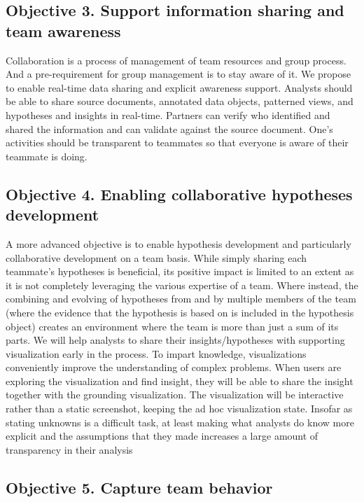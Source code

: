 \subsection{Objective 3. Support information sharing and team awareness}

Collaboration is a process of management of team resources and group process. And a pre-requirement for group management is to stay aware of it. We propose to enable real-time data sharing and explicit awareness support.
Analysts should be able to share source documents, annotated data objects, patterned
views, and hypotheses and insights in real-time. Partners can verify who
identified and shared the information and can validate against the source
document. One’s activities should be transparent to teammates so that everyone is aware of their teammate is doing.

\subsection{Objective 4. Enabling collaborative hypotheses development}

A more advanced objective is to enable hypothesis development and particularly collaborative development on a team basis. While simply
sharing each teammate's hypotheses is beneficial, its positive impact is
limited to an extent as it is not completely leveraging the various expertise
of a team. Where instead, the combining and evolving of hypotheses from and by
multiple members of the team (where the evidence that the hypothesis is based
on is included in the hypothesis object) creates an environment where the team
is more than just a sum of its parts. We will help analysts to share their
insights/hypotheses with supporting visualization early in the process. To
impart knowledge, visualizations conveniently improve the understanding of
complex problems. When users are exploring the visualization and find
insight, they will be able to share the insight together with the grounding
visualization. The visualization will be interactive rather than a static
screenshot, keeping the ad hoc visualization state. Insofar as stating unknowns
is a difficult task, at least making what analysts do know more explicit and
the assumptions that they made increases a large amount of transparency in
their analysis

\subsection{Objective 5. Capture team behavior}

